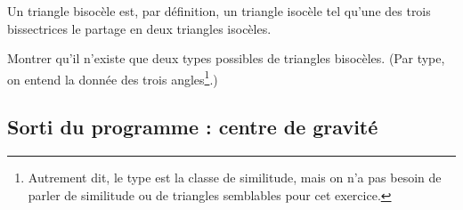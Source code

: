 \begin{exo}
Un triangle bisocèle est, par définition,  un triangle isocèle tel qu'une des trois bissectrices le partage en deux triangles  isocèles.

Montrer qu'il n'existe que deux types possibles de triangles bisocèles. (Par \og type\fg{}, on entend la donnée des trois angles\footnote{Autrement dit, le type est la classe de similitude, mais on n'a pas besoin de parler de similitude ou de triangles semblables pour cet exercice.}.)
\end{exo}




\subsection{Sorti du programme : centre de gravité}

